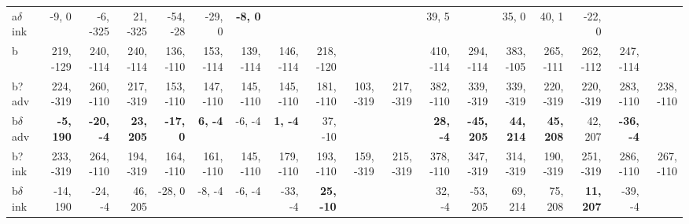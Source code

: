 \begin{table}[p]
{\begin{tabular}{lrrrrrrrrrrrrrrrrr}
a$\delta$ ink & -9, 0 & -6, -325 & 21, -325 & -54, -28 & -29, 0 & \textbf{-8, 0} &  &  &  &  & 39, 5 &  & 35, 0 & 40, 1 & -22, 0 &  &  \\
b & 219, -129 & 240, -114 & 240, -114 & 136, -110 & 153, -114 & 139, -114 & 146, -114 & 218, -120 &  &  & 410, -114 & 294, -114 & 383, -105 & 265, -111 & 262, -112 & 247, -114 &  \\
b? adv & 224, -319 & 260, -110 & 217, -319 & 153, -110 & 147, -110 & 145, -110 & 145, -110 & 181, -110 & 103, -319 & 217, -319 & 382, -110 & 339, -319 & 339, -319 & 220, -319 & 220, -319 & 283, -110 & 238, -110 \\
b$\delta$ adv & \textbf{-5, 190} & \textbf{-20, -4} & \textbf{23, 205} & \textbf{-17, 0} & \textbf{6, -4} & -6, -4 & \textbf{1, -4} & 37, -10 &  &  & \textbf{28, -4} & \textbf{-45, 205} & \textbf{44, 214} & \textbf{45, 208} & 42, 207 & \textbf{-36, -4} &  \\
b? ink & 233, -319 & 264, -110 & 194, -319 & 164, -110 & 161, -110 & 145, -110 & 179, -110 & 193, -110 & 159, -319 & 215, -319 & 378, -110 & 347, -319 & 314, -319 & 190, -319 & 251, -319 & 286, -110 & 267, -110 \\
b$\delta$ ink & -14, 190 & -24, -4 & 46, 205 & -28, 0 & -8, -4 & -6, -4 & -33, -4 & \textbf{25, -10} &  &  & 32, -4 & -53, 205 & 69, 214 & 75, 208 & \textbf{11, 207} & -39, -4 &  \\

\end{tabular}
}
\end{table}
\clearpage


